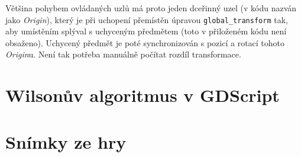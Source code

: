 \documentclass[12pt]{report}
\begin{document}
Většina pohybem ovládaných uzlů má proto jeden dceřinný uzel (v kódu nazván jako \textit{Origin}), který je při uchopení přemístěn úpravou \texttt{global\_transform} tak, aby umístěním splýval s uchyceným předmětem (toto v přiloženém kódu není obsaženo). Uchycený předmět je poté synchronizován s pozicí a rotací tohoto \textit{Origin}u. Není tak potřeba manuálně počítat rozdíl transformace.



\chapter{Wilsonův algoritmus v GDScript}\label{apx_mazegen}


\chapter{Snímky ze hry}
\end{document}
